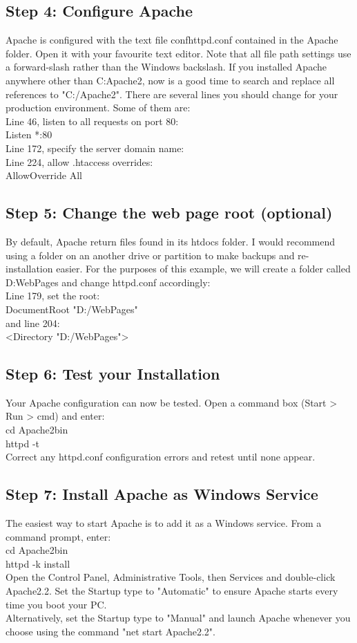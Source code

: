 \subsection*{Step 4: Configure Apache}
Apache is configured with the text file confhttpd.conf contained in the Apache folder. Open it with your favourite text editor.
Note that all file path settings use a forward-slash rather than the Windows backslash. If you installed Apache anywhere other than C:Apache2, now is a good time to search and replace all references to "C:/Apache2".
There are several lines you should change for your production environment. Some of them are:\\
Line 46, listen to all requests on port 80:\\
Listen *:80\\
Line 172, specify the server domain name:\\
Line 224, allow .htaccess overrides:\\
AllowOverride All
\subsection*{Step 5: Change the web page root (optional)}
By default, Apache return files found in its htdocs folder. I would recommend using a folder on an another drive or partition to make backups and re-installation easier. For the purposes of this example, we will create a folder called D:WebPages and change httpd.conf accordingly:\\
Line 179, set the root:\\
DocumentRoot "D:/WebPages"\\
and line 204:\\
<Directory "D:/WebPages">
\subsection*{Step 6: Test your Installation}
Your Apache configuration can now be tested. Open a command box (Start > Run > cmd) and enter:\\
cd Apache2bin\\
httpd -t\\
Correct any httpd.conf configuration errors and retest until none appear.
\subsection*{Step 7: Install Apache as Windows Service}
The easiest way to start Apache is to add it as a Windows service. From a command prompt, enter:\\
cd Apache2bin\\
httpd -k install\\
Open the Control Panel, Administrative Tools, then Services and double-click Apache2.2. Set the Startup type to "Automatic" to ensure Apache starts every time you boot your PC.\\
Alternatively, set the Startup type to "Manual" and launch Apache whenever you choose using the command "net start Apache2.2".
